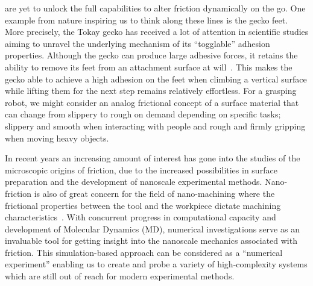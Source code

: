 are yet to unlock the full capabilities to alter friction dynamically on the go.
One example from nature inspiring us to think along these lines is the gecko
feet. More precisely, the Tokay gecko has received a lot of attention in
scientific studies aiming to unravel the underlying mechanism of its
``togglable'' adhesion properties. Although the gecko can produce large adhesive
forces, it retains the ability to remove its feet from an attachment surface
at will~\cite{Gekko}. This makes the gecko able to achieve a high adhesion on
the feet when climbing a vertical surface while lifting them for the next step
remains relatively effortless. For a grasping robot, we might consider an analog
frictional concept of a surface material that can change from slippery to rough
on demand depending on specific tasks; slippery and smooth when interacting with
people and rough and firmly gripping when moving heavy objects.


In recent years an increasing amount of interest has gone into the studies of
the microscopic origins of friction, due to the increased possibilities in
surface preparation and the development of nanoscale experimental methods.
Nano-friction is also of great concern for the field of nano-machining where the
frictional properties between the tool and the workpiece dictate machining
characteristics~\cite{kim_nano-scale_2009}. With concurrent progress in
computational capacity and development of Molecular Dynamics (\acrshort{MD}),
numerical investigations serve as an invaluable tool for getting insight into
the nanoscale mechanics associated with friction. This simulation-based approach
can be considered as a ``numerical experiment'' enabling us to create and probe
a variety of high-complexity systems which are still out of reach for modern
experimental methods.

